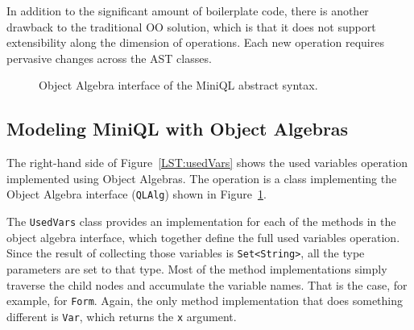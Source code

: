 
In addition to the significant amount of boilerplate code, there is
another drawback to the traditional OO solution, which is that it does
not support extensibility along the dimension of operations. Each new
operation requires pervasive changes across the AST classes.



\begin{figure}[t]
\nocaptionrule
\caption{Object Algebra interface of the MiniQL abstract syntax.}
\label{ql_tree}
\end{figure}

\subsection{Modeling MiniQL with Object Algebras}\label{subsec:model_ql_with_oa}


The right-hand side of Figure~\ref{LST:usedVars} shows the used
variables operation implemented using Object Algebras. The operation
is a class implementing the Object Algebra interface
(\lstinline{QLAlg}) shown in Figure~\ref{ql_tree}.


The \lstinline{UsedVars} class provides an implementation for each
of the methods in the object algebra interface, which together define the
full used variables operation. Since the result of collecting those
variables is \lstinline{Set<String>}, all the type parameters are set to
that type. Most of the method implementations simply traverse the
child nodes and accumulate the variable names. That is the case, for
example, for \lstinline{Form}. Again, the only method implementation that does
something different is \lstinline{Var}, which returns the \lstinline{x}
argument.

